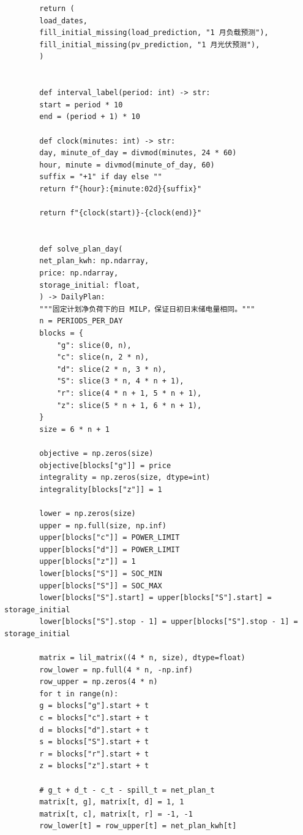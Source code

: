 \documentclass[UTF8]{ctexart}
\begin{document}
\begin{verbatim}
        return (
        load_dates,
        fill_initial_missing(load_prediction, "1 月负载预测"),
        fill_initial_missing(pv_prediction, "1 月光伏预测"),
        )
        
        
        def interval_label(period: int) -> str:
        start = period * 10
        end = (period + 1) * 10
        
        def clock(minutes: int) -> str:
        day, minute_of_day = divmod(minutes, 24 * 60)
        hour, minute = divmod(minute_of_day, 60)
        suffix = "+1" if day else ""
        return f"{hour}:{minute:02d}{suffix}"
        
        return f"{clock(start)}-{clock(end)}"
        
        
        def solve_plan_day(
        net_plan_kwh: np.ndarray,
        price: np.ndarray,
        storage_initial: float,
        ) -> DailyPlan:
        """固定计划净负荷下的日 MILP，保证日初日末储电量相同。"""
        n = PERIODS_PER_DAY
        blocks = {
            "g": slice(0, n),
            "c": slice(n, 2 * n),
            "d": slice(2 * n, 3 * n),
            "S": slice(3 * n, 4 * n + 1),
            "r": slice(4 * n + 1, 5 * n + 1),
            "z": slice(5 * n + 1, 6 * n + 1),
        }
        size = 6 * n + 1
        
        objective = np.zeros(size)
        objective[blocks["g"]] = price
        integrality = np.zeros(size, dtype=int)
        integrality[blocks["z"]] = 1
        
        lower = np.zeros(size)
        upper = np.full(size, np.inf)
        upper[blocks["c"]] = POWER_LIMIT
        upper[blocks["d"]] = POWER_LIMIT
        upper[blocks["z"]] = 1
        lower[blocks["S"]] = SOC_MIN
        upper[blocks["S"]] = SOC_MAX
        lower[blocks["S"].start] = upper[blocks["S"].start] = storage_initial
        lower[blocks["S"].stop - 1] = upper[blocks["S"].stop - 1] = storage_initial
        
        matrix = lil_matrix((4 * n, size), dtype=float)
        row_lower = np.full(4 * n, -np.inf)
        row_upper = np.zeros(4 * n)
        for t in range(n):
        g = blocks["g"].start + t
        c = blocks["c"].start + t
        d = blocks["d"].start + t
        s = blocks["S"].start + t
        r = blocks["r"].start + t
        z = blocks["z"].start + t
        
        # g_t + d_t - c_t - spill_t = net_plan_t
        matrix[t, g], matrix[t, d] = 1, 1
        matrix[t, c], matrix[t, r] = -1, -1
        row_lower[t] = row_upper[t] = net_plan_kwh[t]
        

\end{verbatim}
\end{document}

